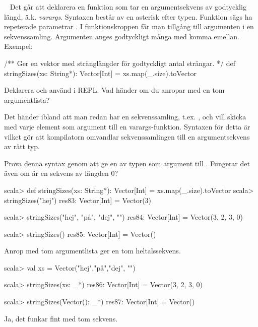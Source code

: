 \AdvancedTasks %




\QUESTBEGIN

\Task  \what~  Det går att deklarera en funktion som tar en argumentsekvens av godtycklig längd, ä.k. \emph{varargs}. Syntaxen består av en asterisk \code{*} efter typen. Funktion sägs ha repeterade parametrar . I funktionskroppen får man tillgång till argumenten i en sekvenssamling. Argumenten anges godtyckligt många med komma emellan. Exempel:
\begin{Code}
/** Ger en vektor med stränglängder för godtyckligt antal strängar. */
def stringSizes(xs: String*): Vector[Int] = xs.map(_.size).toVector
\end{Code}

\Subtask Deklarera och använd  i REPL. Vad händer om du anropar  med en tom argumentlista?

\Subtask Det händer ibland att man redan har en sekvenssamling, t.ex. , och vill skicka med varje element som argument till en varargs-funktion. Syntaxen för detta är  vilket gör att kompilatorn omvandlar sekvenssamlingen till en argumentsekvens av rätt typ.

Prova denna syntax genom att ge en  av typen  som argument till . Fungerar det även om  är en sekvens av längden 0?

\SOLUTION

\TaskSolved \what

\SubtaskSolved

\begin{REPL}
scala> def stringSizes(xs: String*): Vector[Int] = xs.map(_.size).toVector
scala> stringSizes("hej")
res83: Vector[Int] = Vector(3)

scala> stringSizes("hej", "på", "dej", "")
res84: Vector[Int] = Vector(3, 2, 3, 0)

scala> stringSizes()
res85: Vector[Int] = Vector()
\end{REPL}

\noindent Anrop med tom argumentlista ger en tom heltalssekvens.

\SubtaskSolved

\begin{REPL}
scala> val xs = Vector("hej","på","dej", "")

scala> stringSizes(xs: _*)
res86: Vector[Int] = Vector(3, 2, 3, 0)

scala> stringSizes(Vector(): _*)
res87: Vector[Int] = Vector()
\end{REPL}
Ja, det funkar fint med tom sekvens.



